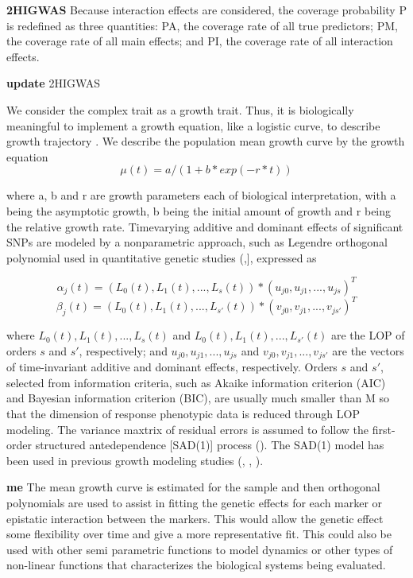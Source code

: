 \documentclass[11pt,]{book}
\theoremstyle{definition}
\theoremstyle{definition}
\theoremstyle{remark}
\begin{document}
\textbf{2HIGWAS} Because interaction effects are considered, the
coverage probability P is redefined as three quantities: PA, the
coverage rate of all true predictors; PM, the coverage rate of all main
effects; and PI, the coverage rate of all interaction effects.

\textbf{update} 2HIGWAS \cite{jiang20152higwas}

We consider the complex trait as a growth trait. Thus, it is
biologically meaningful to implement a growth equation, like a logistic
curve, to describe growth trajectory \cite{west2001general}. We describe
the population mean growth curve by the growth equation
\[\mu(t) = a/(1 + b * exp(-r*t))\]

where a, b and r are growth parameters each of biological
interpretation, with a being the asymptotic growth, b being the initial
amount of growth and r being the relative growth rate. Timevarying
additive and dominant effects of significant SNPs are modeled by a
nonparametric approach, such as Legendre orthogonal polynomial used in
quantitative genetic studies
(\cite{olori1999estimating},\cite{li2010functional}{]}, expressed as

\[ \alpha_j(t) = (L_0(t), L_1(t), ... , L_s(t))*(u_{j0}, u_{j1},...,u_{js})^T \]
\[ \beta_j(t) = (L_0(t), L_1(t), ... , L_{s'}(t))*(v_{j0}, v_{j1},...,v_{js'})^T \]

where \(L_0(t), L_1(t), ... , L_s(t)\) and
\(L_0(t), L_1(t), ... , L_{s'}(t)\) are the LOP of orders \(s\) and
\(s'\), respectively; and \(u_{j0}, u_{j1},...,u_{js}\) and
\(v_{j0}, v_{j1},...,v_{js'}\) are the vectors of time-invariant
additive and dominant effects, respectively. Orders \(s\) and \(s'\),
selected from information criteria, such as Akaike information criterion
(AIC) and Bayesian information criterion (BIC), are usually much smaller
than M so that the dimension of response phenotypic data is reduced
through LOP modeling. The variance maxtrix of residual errors is assumed
to follow the first-order structured antedependence {[}SAD(1){]} process
(\cite{li2010functional}). The SAD(1) model has been used in previous
growth modeling studies (\cite{li2010functional},
\cite{ahn2010functional}, \cite{das2011dynamic}).

\textbf{me} The mean growth curve is estimated for the sample and then
orthogonal polynomials are used to assist in fitting the genetic effects
for each marker or epistatic interaction between the markers. This would
allow the genetic effect some flexibility over time and give a more
representative fit. This could also be used with other semi parametric
functions to model dynamics or other types of non-linear functions that
characterizes the biological systems being evaluated.
\end{document}

